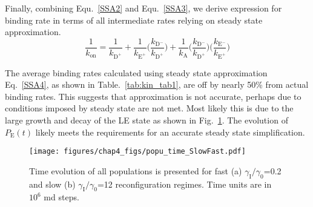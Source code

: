 \documentclass[../talant.diss.submit.tex]{subfiles}
\begin{document}
Finally, combining Equ.~\ref{SSA2} and Equ.~\ref{SSA3}, we derive expression for binding
rate in terms of all intermediate rates relying on steady state approximation.
%
\begin{equation}
  \label{SSA4}
  \frac{1}{k_{\mathrm{on}}} = \frac{1}{k_{\mathrm{D}^{+}}} +
  \frac{1}{k_{\mathrm{E}^{+}}} \Big( \frac{k_{\mathrm{D}^{-}}}{k_{\mathrm{D}^{+}}} \Big) +
  \frac{1}{k_{\mathrm{A}}} \Big( \frac{k_{\mathrm{D}^{-}}}{k_{\mathrm{D}^{+}}} \Big)
  \Big( \frac{k_{\mathrm{E}^{-}}}{k_{\mathrm{E}^{+}}} \Big)
\end{equation}                                                                                                 



The average binding rates calculated using steady state approximation Eq.~\ref{SSA4}, as shown in
Table.~\ref{tab:kin_tab1}, are off by nearly 50\% from actual binding rates. This
suggests that approximation is not accurate, perhaps due to conditions imposed by steady state
are not met. Most likely this is due to the large growth and decay of the LE state as shown in
Fig.~\ref{fig:popu_time_sf}. The evolution of $P_\mathrm{E}(t)$ likely meets the requirements
for an accurate steady state simplification.


\begin{figure}[htp!]
  \begin{centering}                                                                                        
    \texttt{[image: figures/chap4\_figs/popu\_time\_SlowFast.pdf]}
    \caption{Time evolution of all populations is presented for fast (a)
      $\gamma_{\mathrm{I}} / \gamma_0$=0.2 and slow (b) $\gamma_{\mathrm{I}} / \gamma_0$=12
      reconfiguration regimes. Time units are in $10^{6}$ md steps.}                    
\label{fig:popu_time_sf}                                                                                 
  \end{centering}
\end{figure}                                                                                             
\end{document}
